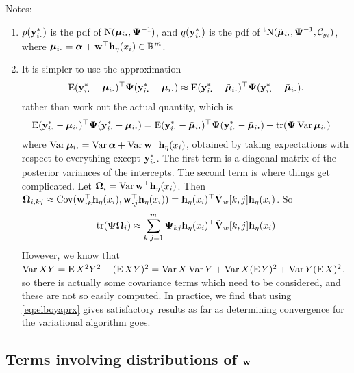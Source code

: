 Notes:
\begin{enumerate}
  \item $p(\by_{i \bigcdot}^*)$ is the pdf of $\N(\bmu_{i \bigcdot}, \bPsi^{-1})$, and $q(\by_{i \bigcdot}^*)$ is the pdf of $\tN(\tilde\bmu_{i \bigcdot}, \bPsi^{-1}, \cC_{y_i})$, where $\bmu_{i \bigcdot} = \balpha + \bw^\top\bh_\eta(x_i) \in \bbR^m$.
  \item \label{note2} It is simpler to use the approximation
  \begin{align}\label{eq:elboyaprx}
    \E (\by^*_{i \bigcdot} - \bmu_{i \bigcdot})^\top \bPsi (\by^*_{i \bigcdot} - \bmu_{i \bigcdot})
    \approx \E (\by^*_{i \bigcdot} - \tilde\bmu_{i \bigcdot})^\top \bPsi (\by^*_{i \bigcdot} - \tilde\bmu_{i \bigcdot}).   
  \end{align}
  rather than work out the actual quantity, which is
  \begin{align}\label{eq:elboyact}
    \E (\by^*_{i \bigcdot} - \bmu_{i \bigcdot})^\top \bPsi (\by^*_{i \bigcdot} - \bmu_{i \bigcdot})
    &= \E (\by^*_{i \bigcdot} - \tilde\bmu_{i \bigcdot})^\top \bPsi (\by^*_{i \bigcdot} - \tilde\bmu_{i \bigcdot}) + \tr(\bPsi\Var \bmu_{i \bigcdot})
  \end{align}
  where $\Var \bmu_{i \bigcdot} = \Var \balpha + \Var \bw^\top\bh_\eta(x_i)$, obtained by taking expectations with respect to everything except $\by^*_{i \bigcdot}$.
  The first term is a diagonal matrix of the posterior variances of the intercepts.
  The second term is where things get complicated.
  Let ${\bm\Omega}_i = \operatorname{Var} {\mathbf w}^\top{\mathbf h}_\eta(x_i)$. 
  Then $\bOmega_{i,kj} \approx \Cov(\bw^\top_{\bigcdot k}\bh_\eta(x_i), \bw^\top_{\bigcdot j}\bh_\eta(x_i)) = \bh_\eta(x_i)^\top \tilde\bV_w[k,j]\bh_\eta(x_i)$. 
  So
  \[
    \operatorname{tr}({\bm\Psi} {\bm\Omega}_i) \approx \sum_{k,j=1}^m {\bm\Psi}_{kj} {\mathbf h}_\eta(x_i)^\top \tilde{{\mathbf V}}_w[k,j]{\mathbf h}_\eta(x_i)
  \]
  However, we know that $\operatorname{Var} XY = \operatorname{E} X^2Y^2 - (\operatorname{E} XY)^2 = \operatorname{Var} X \operatorname{Var} Y + \operatorname{Var} X (\operatorname{E} Y)^2 + \operatorname{Var} Y (\operatorname{E} X)^2$, so there is actually some covariance terms which need to be considered, and these are not so easily computed.
  In practice, we find that using \cref{eq:elboyaprx} gives satisfactory results as far as determining convergence for the variational algorithm goes. 
\end{enumerate}

\subsection{Terms involving distributions of ${\mathbf w}$}

